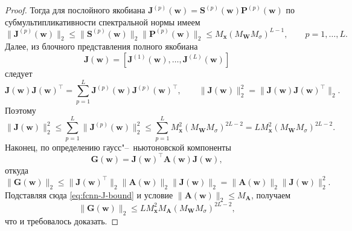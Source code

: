 \begin{proof}
    Тогда для послойного якобиана $\mathbf{J}^{(p)}(\mathbf{w}) = \mathbf{S}^{(p)}(\mathbf{w})\mathbf{P}^{(p)}(\mathbf{w})$ по субмультипликативности спектральной нормы имеем
    \begin{equation}
        \label{eq:fcnn-Jp-bound}
        \|\mathbf{J}^{(p)}(\mathbf{w})\|_2
        \leqslant
        \|\mathbf{S}^{(p)}(\mathbf{w})\|_2
        \|\mathbf{P}^{(p)}(\mathbf{w})\|_2
        \leqslant
        M_{\mathbf{x}} \left(M_{\mathbf{W}}M_{\sigma}\right)^{L-1},
        \qquad p = 1, \ldots, L.
    \end{equation}
    Далее, из блочного представления полного якобиана
    \begin{equation}
        \mathbf{J}(\mathbf{w})
        =
        \left[
        \mathbf{J}^{(1)}(\mathbf{w}), \ldots, \mathbf{J}^{(L)}(\mathbf{w})
        \right]
    \end{equation}
    следует
    \begin{equation}
        \mathbf{J}(\mathbf{w})\mathbf{J}(\mathbf{w})^\top
        =
        \sum_{p=1}^L
        \mathbf{J}^{(p)}(\mathbf{w})\mathbf{J}^{(p)}(\mathbf{w})^\top,
        \qquad
        \|\mathbf{J}(\mathbf{w})\|_2^2
        =
        \|\mathbf{J}(\mathbf{w})\mathbf{J}(\mathbf{w})^\top\|_2.
    \end{equation}
    Поэтому
    \begin{equation}
        \label{eq:fcnn-J-bound}
        \|\mathbf{J}(\mathbf{w})\|_2^2
        \leqslant
        \sum_{p=1}^L \|\mathbf{J}^{(p)}(\mathbf{w})\|_2^2
        \leqslant
        \sum_{p=1}^L M_{\mathbf{x}}^2 (M_{\mathbf{W}}M_{\sigma})^{2L-2}
        =
        L M_{\mathbf{x}}^2 \left(M_{\mathbf{W}}M_{\sigma}\right)^{2L-2}.
    \end{equation}
    Наконец, по определению гаусс"--~ньютоновской компоненты
    \begin{equation}
        \mathbf{G}(\mathbf{w})
        =
        \mathbf{J}(\mathbf{w})^\top \mathbf{A}(\mathbf{w}) \mathbf{J}(\mathbf{w}),
    \end{equation}
    откуда
    \begin{equation}
        \|\mathbf{G}(\mathbf{w})\|_2
        \leqslant
        \|\mathbf{J}(\mathbf{w})^\top\|_2
        \|\mathbf{A}(\mathbf{w})\|_2
        \|\mathbf{J}(\mathbf{w})\|_2
        =
        \|\mathbf{A}(\mathbf{w})\|_2 \|\mathbf{J}(\mathbf{w})\|_2^2.
    \end{equation}
    Подставляя сюда \eqref{eq:fcnn-J-bound} и условие $\|\mathbf{A}(\mathbf{w})\|_2 \leqslant M_{\mathbf{A}}$, получаем
    \begin{equation}
        \|\mathbf{G}(\mathbf{w})\|_2
        \leqslant
        L M_{\mathbf{x}}^2 M_{\mathbf{A}} \left(M_{\mathbf{W}} M_{\sigma}\right)^{2L-2},
    \end{equation}
    что и требовалось доказать.
\end{proof}

